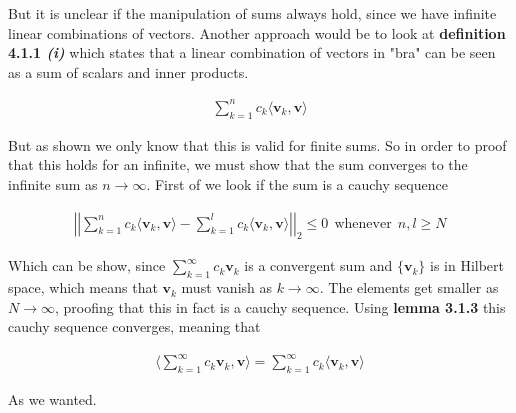 \documentclass{article}
\begin{document}
But it is unclear if the manipulation of sums always hold, since we have infinite linear combinations of vectors. Another approach would be to look at \textbf{definition 4.1.1 \textit{(i)}} which states that a linear combination of vectors in "bra" can be seen as a sum of scalars and inner products. 

\begin{gather*}
    \sum_{k=1}^n c_k \langle\mathbf{v}_k,\mathbf{v} \rangle
\end{gather*}

But as shown we only know that this is valid for finite sums. So in order to proof that this holds for an infinite, we must show that the sum converges to the infinite sum as $n\rightarrow \infty$. First of we look if the sum is a cauchy sequence

\begin{gather*}
    \left| \left|\sum_{k=1}^n c_k \langle\mathbf{v}_k,\mathbf{v} \rangle - \sum_{k=1}^l c_k \langle\mathbf{v}_k,\mathbf{v} \rangle \right| \right|_2 \leq 0 \: \: \text{whenever} \: \: n,l \geq N
\end{gather*}

Which can be show, since $\sum_{k=1}^\infty c_k \mathbf{v}_k$ is a convergent sum and $\{\mathbf{v}_k\}$ is in Hilbert space, which means that $\mathbf{v}_k$ must vanish as $k\rightarrow \infty$. The elements get smaller as $N\rightarrow \infty$, proofing that this in fact is a cauchy sequence. Using \textbf{lemma 3.1.3 } this cauchy sequence converges, meaning that

\begin{gather*}
    \langle \sum_{k=1}^\infty c_k \mathbf{v}_k,\mathbf{v}\rangle = \sum_{k=1}^\infty c_k \langle\mathbf{v}_k,\mathbf{v} \rangle
\end{gather*}

As we wanted.
\end{document}
